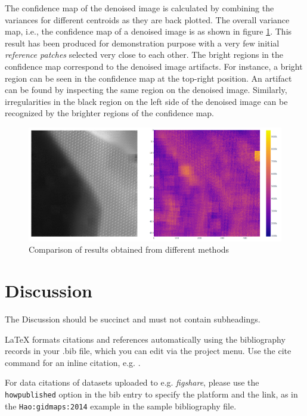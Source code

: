 \documentclass[fleqn,10pt]{wlscirep}
\begin{document}
	The confidence map of the denoised image is calculated by combining the variances\cite{chan1982updating} for different centroids as they are back plotted. The overall variance map, i.e., the confidence map of a denoised image is as shown in figure \ref{fig:confidence_map}. This result has been produced for demonstration purpose with a very few initial \textit{reference patches} selected very close to each other. The bright regions in the confidence map correspond to the denoised image artifacts. For instance, a bright region can be seen in the confidence map at the top-right position. An artifact can be found by inspecting the same region on the denoised image. Similarly, irregularities in the black region on the left side of the denoised image can be recognized by the brighter regions of the confidence map.
	
	\begin{figure}[H]
		\centering
		\includegraphics[scale=0.7]{./imgs/confidence_map.png}
		\caption{Comparison of results obtained from different methods}
		\label{fig:confidence_map}
	\end{figure}
	
	\section*{Discussion}
	
	The Discussion should be succinct and must not contain subheadings.
	
	
	
	
	\noindent LaTeX formats citations and references automatically using the bibliography records in your .bib file, which you can edit via the project menu. Use the cite command for an inline citation, e.g.  \cite{Hao:gidmaps:2014}.
	
	For data citations of datasets uploaded to e.g. \emph{figshare}, please use the \verb|howpublished| option in the bib entry to specify the platform and the link, as in the \verb|Hao:gidmaps:2014| example in the sample bibliography file.
	
\end{document}
